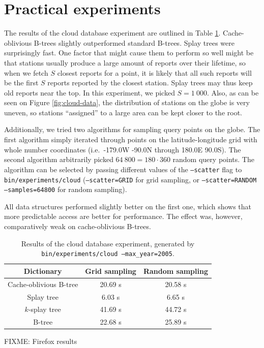 \section{Practical experiments}
The results of the cloud database experiment are outlined in Table
\ref{tab:cloud-results}. Cache-oblivious B-trees slightly outperformed
standard B-trees. Splay trees were surprisingly fast. One factor that might
cause them to perform so well might be that stations usually produce a large
amount of reports over their lifetime, so when we fetch $S$ closest reports
for a point, it is likely that all such reports will be the first $S$ reports
reported by the closest station. Splay trees may thus keep old reports
near the top. In this experiment, we picked $S=1~000$. Also, as can be
seen on Figure \ref{fig:cloud-data}, the distribution of stations on the globe
is very uneven, so stations ``assigned'' to a large area can be kept closer to
the root.

Additionally, we tried two algorithms for sampling query points on the globe.
The first algorithm simply iterated through points on the latitude-longitude
grid with whole number coordinates (i.e.\ -179.0\textdegree W -90.0\textdegree N
through 180.0\textdegree E 90.0\textdegree S).
The second algorithm arbitrarily picked $64~800=180\cdot 360$ random query
points.
The algorithm can be selected by passing different values of the
\texttt{--scatter} flag to \texttt{bin/experiments/cloud}
(\texttt{--scatter=GRID} for grid sampling, or \texttt{--scatter=RANDOM
--samples=64800} for random sampling).

All data structures performed slightly better on the first one, which shows
that more predictable access are better for performance. The effect was,
however, comparatively weak on cache-oblivious B-trees.

\begin{table}
\centering
\begin{tabular}{|c|c|c|}
%
	\hline
	Dictionary & Grid sampling & Random sampling \\
	\hline

	Cache-oblivious B-tree & 20.69 s & 20.58 s \\
	\hline
	Splay tree & 6.03 s & 6.65 s \\
	\hline
	$k$-splay tree & 41.69 s & 44.72 s \\
	\hline
	B-tree & 22.68 s & 25.89 s \\
	\hline
\end{tabular}
\caption{Results of the cloud database experiment, generated
	by \texttt{bin/experiments/cloud --max\_year=2005}.
}
\label{tab:cloud-results}
\end{table}

FIXME: Firefox results
